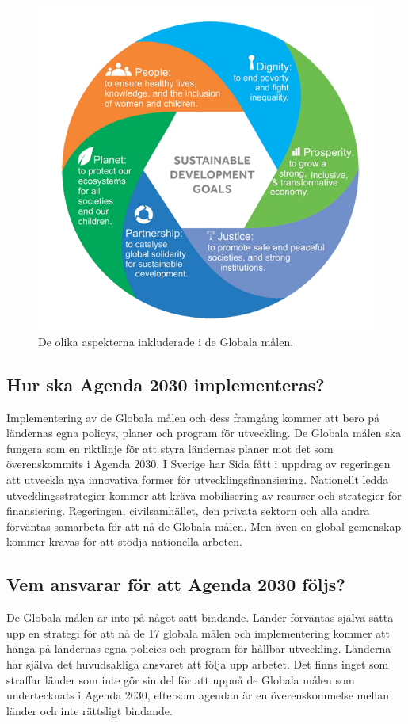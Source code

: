 \documentclass{report}
\begin{document}
\begin{figure}[h]
\label{dimensioner}
\includegraphics[width=\linewidth]{dimensioner.png}
\caption{De olika aspekterna inkluderade i de Globala målen. \cite{Dochas}} 
\end{figure}

\subsection{Hur ska Agenda 2030 implementeras?} 
Implementering av de Globala målen och dess framgång kommer att bero på ländernas egna policys, planer och program för utveckling. De Globala målen ska fungera som en riktlinje för att styra ländernas planer mot det som överenskommits i Agenda 2030. \cite{web2030agenda}
I Sverige har Sida fått i uppdrag av regeringen att utveckla nya innovativa former för utvecklingsfinansiering. \cite{webSIDA}
Nationellt ledda utvecklingsstrategier kommer att kräva mobilisering av resurser och strategier för finansiering. Regeringen, civilsamhället, den privata sektorn och alla andra förväntas samarbeta för att nå de Globala målen. Men även en global gemenskap kommer krävas för att stödja nationella arbeten.\cite{web2030agenda}\\

\subsection{Vem ansvarar för att Agenda 2030 följs?} 
De Globala målen är inte på något sätt bindande. Länder förväntas själva sätta upp en strategi för att nå de 17 globala målen och implementering kommer att hänga på ländernas egna policies och program för hållbar utveckling. Länderna har själva det huvudsakliga ansvaret att följa upp arbetet. Det finns inget som straffar länder som inte gör sin del för att uppnå de Globala målen som undertecknats i Agenda 2030, eftersom agendan är en överenskommelse mellan länder och inte rättsligt bindande. \cite{web2030agenda}\\
\end{document}
